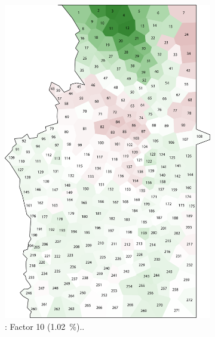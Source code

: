\documentclass[output=paper]{LSP/langsci}
\begin{document}
\begin{figure}
\begin{subfigure}[t]{0.3\textwidth}
\includegraphics[width=\textwidth]{illustrations/pickl_fig9}
\caption{: Factor 10 (1.02~\%)..}
\label{fig:9}
\end{subfigure}   
~
\begin{subfigure}[t]{0.3\textwidth}

\end{subfigure}
\end{figure}
\end{document}
